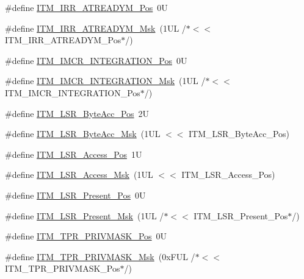 \begin{DoxyCompactItemize}
\#define \hyperlink{group___c_m_s_i_s___i_t_m_ga259edfd1d2e877a62e06d7a240df97f4}{I\+T\+M\+\_\+\+I\+R\+R\+\_\+\+A\+T\+R\+E\+A\+D\+Y\+M\+\_\+\+Pos}~0U
\item 
\#define \hyperlink{group___c_m_s_i_s___i_t_m_ga3dbc3e15f5bde2669cd8121a1fe419b9}{I\+T\+M\+\_\+\+I\+R\+R\+\_\+\+A\+T\+R\+E\+A\+D\+Y\+M\+\_\+\+Msk}~(1\+U\+L /$\ast$$<$$<$ I\+T\+M\+\_\+\+I\+R\+R\+\_\+\+A\+T\+R\+E\+A\+D\+Y\+M\+\_\+\+Pos$\ast$/)
\item 
\#define \hyperlink{group___c_m_s_i_s___i_t_m_ga08de02bf32caf48aaa29f7c68ff5d755}{I\+T\+M\+\_\+\+I\+M\+C\+R\+\_\+\+I\+N\+T\+E\+G\+R\+A\+T\+I\+O\+N\+\_\+\+Pos}~0U
\item 
\#define \hyperlink{group___c_m_s_i_s___i_t_m_ga8838bd3dd04c1a6be97cd946364a3fd2}{I\+T\+M\+\_\+\+I\+M\+C\+R\+\_\+\+I\+N\+T\+E\+G\+R\+A\+T\+I\+O\+N\+\_\+\+Msk}~(1\+U\+L /$\ast$$<$$<$ I\+T\+M\+\_\+\+I\+M\+C\+R\+\_\+\+I\+N\+T\+E\+G\+R\+A\+T\+I\+O\+N\+\_\+\+Pos$\ast$/)
\item 
\#define \hyperlink{group___c_m_s_i_s___i_t_m_gabfae3e570edc8759597311ed6dfb478e}{I\+T\+M\+\_\+\+L\+S\+R\+\_\+\+Byte\+Acc\+\_\+\+Pos}~2U
\item 
\#define \hyperlink{group___c_m_s_i_s___i_t_m_ga91f492b2891bb8b7eac5b58de7b220f4}{I\+T\+M\+\_\+\+L\+S\+R\+\_\+\+Byte\+Acc\+\_\+\+Msk}~(1\+U\+L $<$$<$ I\+T\+M\+\_\+\+L\+S\+R\+\_\+\+Byte\+Acc\+\_\+\+Pos)
\item 
\#define \hyperlink{group___c_m_s_i_s___i_t_m_ga144a49e12b83ad9809fdd2769094fdc0}{I\+T\+M\+\_\+\+L\+S\+R\+\_\+\+Access\+\_\+\+Pos}~1U
\item 
\#define \hyperlink{group___c_m_s_i_s___i_t_m_gac8ae69f11c0311da226c0c8ec40b3d37}{I\+T\+M\+\_\+\+L\+S\+R\+\_\+\+Access\+\_\+\+Msk}~(1\+U\+L $<$$<$ I\+T\+M\+\_\+\+L\+S\+R\+\_\+\+Access\+\_\+\+Pos)
\item 
\#define \hyperlink{group___c_m_s_i_s___i_t_m_gaf5740689cf14564d3f3fd91299b6c88d}{I\+T\+M\+\_\+\+L\+S\+R\+\_\+\+Present\+\_\+\+Pos}~0U
\item 
\#define \hyperlink{group___c_m_s_i_s___i_t_m_gaa5bc2a7f5f1d69ff819531f5508bb017}{I\+T\+M\+\_\+\+L\+S\+R\+\_\+\+Present\+\_\+\+Msk}~(1\+U\+L /$\ast$$<$$<$ I\+T\+M\+\_\+\+L\+S\+R\+\_\+\+Present\+\_\+\+Pos$\ast$/)
\item 
\#define \hyperlink{group___c_m_s_i_s___i_t_m_ga7abe5e590d1611599df87a1884a352e8}{I\+T\+M\+\_\+\+T\+P\+R\+\_\+\+P\+R\+I\+V\+M\+A\+S\+K\+\_\+\+Pos}~0U
\item 
\#define \hyperlink{group___c_m_s_i_s___i_t_m_ga168e089d882df325a387aab3a802a46b}{I\+T\+M\+\_\+\+T\+P\+R\+\_\+\+P\+R\+I\+V\+M\+A\+S\+K\+\_\+\+Msk}~(0x\+F\+U\+L /$\ast$$<$$<$ I\+T\+M\+\_\+\+T\+P\+R\+\_\+\+P\+R\+I\+V\+M\+A\+S\+K\+\_\+\+Pos$\ast$/)

\end{DoxyCompactItemize}
